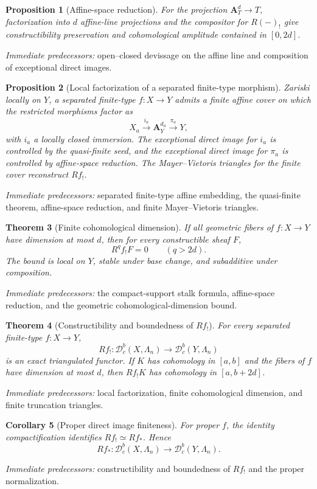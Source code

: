 \documentclass[10pt]{article}
\newtheorem{theorem}{Theorem}[section]
\newtheorem{proposition}[theorem]{Proposition}
\newtheorem{corollary}[theorem]{Corollary}
\theoremstyle{definition}
\newcommand{\Dbc}{\mathcal D^b_c}
\newcommand{\pred}[1]{\par\smallskip\begingroup\footnotesize\raggedright
\emph{Immediate predecessors:} #1.\par\endgroup}
\begin{document}
\begin{proposition}[Affine-space reduction]
For the projection \(\mathbf A^d_T\to T\), factorization into \(d\)
affine-line projections and the compositor for \(R(-)_!\) give
constructibility preservation and cohomological amplitude contained in
\([0,2d]\).
\end{proposition}
\pred{open--closed devissage on the affine line and composition of exceptional direct images}

\begin{proposition}[Local factorization of a separated finite-type morphism]
Zariski locally on \(Y\), a separated finite-type
\(f:X\to Y\) admits a finite affine cover on which the restricted morphisms
factor as
\[
 X_a\xrightarrow{i_a}\mathbf A^{d_a}_Y
 \xrightarrow{\pi_a}Y,
\]
with \(i_a\) a locally closed immersion.  The exceptional direct image for
\(i_a\) is controlled by the quasi-finite seed, and the exceptional direct
image for \(\pi_a\) is controlled by affine-space reduction.  The
Mayer--Vietoris triangles for the finite cover reconstruct \(Rf_!\).
\end{proposition}
\pred{separated finite-type affine embedding, the quasi-finite theorem, affine-space reduction, and finite Mayer--Vietoris triangles}

\begin{theorem}[Finite cohomological dimension]
If all geometric fibers of \(f:X\to Y\) have dimension at most \(d\), then
for every constructible sheaf \(F\),
\[
 R^qf_!F=0\qquad(q>2d).
\]
The bound is local on \(Y\), stable under base change, and subadditive under
composition.
\end{theorem}
\pred{the compact-support stalk formula, affine-space reduction, and the geometric cohomological-dimension bound}

\begin{theorem}[Constructibility and boundedness of
\texorpdfstring{\(Rf_!\)}{Rf!}]
For every separated finite-type \(f:X\to Y\),
\[
 Rf_!:\Dbc(X,\Lambda_n)\longrightarrow\Dbc(Y,\Lambda_n)
\]
is an exact triangulated functor.  If \(K\) has cohomology in \([a,b]\) and
the fibers of \(f\) have dimension at most \(d\), then \(Rf_!K\) has
cohomology in \([a,b+2d]\).
\end{theorem}
\pred{local factorization, finite cohomological dimension, and finite truncation triangles}

\begin{corollary}[Proper direct image finiteness]
For proper \(f\), the identity compactification identifies
\(Rf_!\simeq Rf_*\).  Hence
\[
 Rf_*:\Dbc(X,\Lambda_n)\longrightarrow\Dbc(Y,\Lambda_n).
\]
\end{corollary}
\pred{constructibility and boundedness of \(Rf_!\) and the proper normalization}
\end{document}
